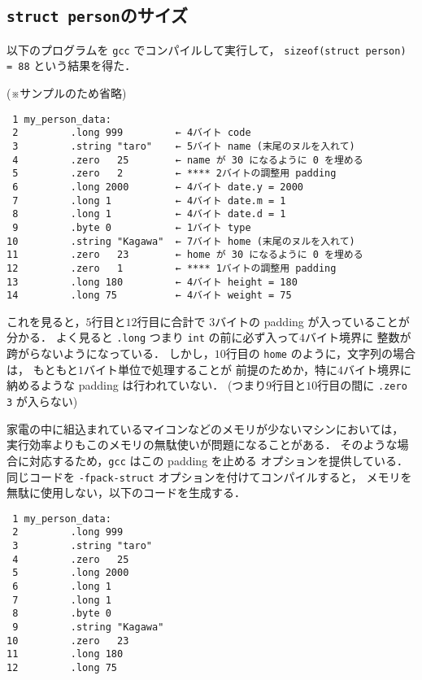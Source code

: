 \documentclass[a4j,11pt]{jarticle}
\begin{document}
\subsection{\texttt{struct person}のサイズ}

以下のプログラムを \verb|gcc| でコンパイルして実行して，
\verb|sizeof(struct person) = 88| という結果を得た．

(※サンプルのため省略)

{\fontsize{10pt}{11pt} \selectfont
 \begin{verbatim}
 1 my_person_data:
 2         .long 999         ← 4バイト code
 3         .string "taro"    ← 5バイト name (末尾のヌルを入れて)
 4         .zero   25        ← name が 30 になるように 0 を埋める
 5         .zero   2         ← **** 2バイトの調整用 padding
 6         .long 2000        ← 4バイト date.y = 2000
 7         .long 1           ← 4バイト date.m = 1
 8         .long 1           ← 4バイト date.d = 1
 9         .byte 0           ← 1バイト type
10         .string "Kagawa"  ← 7バイト home (末尾のヌルを入れて)
11         .zero   23        ← home が 30 になるように 0 を埋める
12         .zero   1         ← **** 1バイトの調整用 padding
13         .long 180         ← 4バイト height = 180
14         .long 75          ← 4バイト weight = 75
 \end{verbatim}
}

これを見ると，$5$行目と$12$行目に合計で
$3$バイトの padding が入っていることが分かる．
よく見ると \verb|.long| つまり \verb|int| の前に必ず入って$4$バイト境界に
整数が跨がらないようになっている．
しかし，$10$行目の \verb|home| のように，文字列の場合は，
もともと$1$バイト単位で処理することが
前提のためか，特に$4$バイト境界に納めるような padding は行われていない．
(つまり$9$行目と$10$行目の間に \verb|.zero 3| が入らない)

家電の中に組込まれているマイコンなどのメモリが少ないマシンにおいては，
実行効率よりもこのメモリの無駄使いが問題になることがある．
そのような場合に対応するため，\verb|gcc| はこの padding を止める
オプションを提供している．
同じコードを \verb|-fpack-struct| オプションを付けてコンパイルすると，
メモリを無駄に使用しない，以下のコードを生成する．

{\fontsize{10pt}{11pt} \selectfont
\begin{verbatim}
 1 my_person_data:
 2         .long 999
 3         .string "taro"
 4         .zero   25
 5         .long 2000
 6         .long 1
 7         .long 1
 8         .byte 0
 9         .string "Kagawa"
10         .zero   23
11         .long 180
12         .long 75
\end{verbatim}
}
\end{document}
